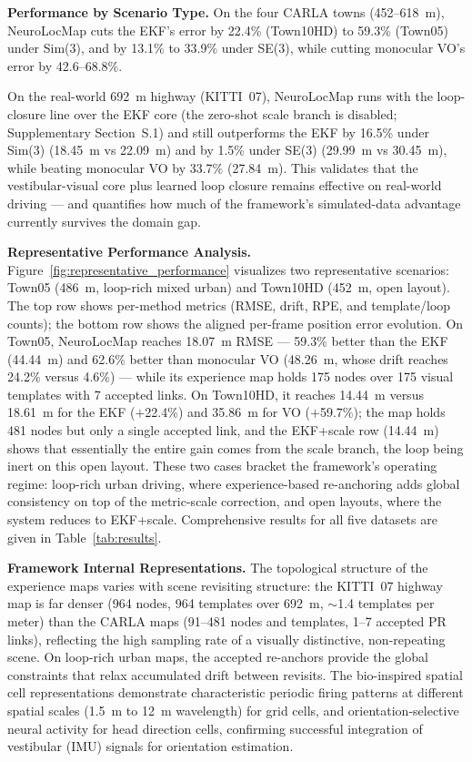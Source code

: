 \textbf{Performance by Scenario Type.} On the four CARLA towns (452--618~m), NeuroLocMap cuts the EKF's error by 22.4\% (Town10HD) to 59.3\% (Town05) under Sim(3), and by 13.1\% to 33.9\% under SE(3), while cutting monocular VO's error by 42.6--68.8\%.

On the real-world 692~m highway (KITTI~07), NeuroLocMap runs with the loop-closure line over the EKF core (the zero-shot scale branch is disabled; Supplementary Section~S.1) and still outperforms the EKF by 16.5\% under Sim(3) (18.45~m vs 22.09~m) and by 1.5\% under SE(3) (29.99~m vs 30.45~m), while beating monocular VO by 33.7\% (27.84~m). This validates that the vestibular-visual core plus learned loop closure remains effective on real-world driving --- and quantifies how much of the framework's simulated-data advantage currently survives the domain gap.

\textbf{Representative Performance Analysis.} Figure~\ref{fig:representative_performance} visualizes two representative scenarios: Town05 (486~m, loop-rich mixed urban) and Town10HD (452~m, open layout). The top row shows per-method metrics (RMSE, drift, RPE, and template/loop counts); the bottom row shows the aligned per-frame position error evolution. On Town05, NeuroLocMap reaches 18.07~m RMSE --- 59.3\% better than the EKF (44.44~m) and 62.6\% better than monocular VO (48.26~m, whose drift reaches 24.2\% versus 4.6\%) --- while its experience map holds 175 nodes over 175 visual templates with 7 accepted links. On Town10HD, it reaches 14.44~m versus 18.61~m for the EKF ($+$22.4\%) and 35.86~m for VO ($+$59.7\%); the map holds 481 nodes but only a single accepted link, and the EKF+scale row (14.44~m) shows that essentially the entire gain comes from the scale branch, the loop being inert on this open layout. These two cases bracket the framework's operating regime: loop-rich urban driving, where experience-based re-anchoring adds global consistency on top of the metric-scale correction, and open layouts, where the system reduces to EKF+scale. Comprehensive results for all five datasets are given in Table~\ref{tab:results}.

\textbf{Framework Internal Representations.} The topological structure of the experience maps varies with scene revisiting structure: the KITTI~07 highway map is far denser (964 nodes, 964 templates over 692~m, $\sim$1.4 templates per meter) than the CARLA maps (91--481 nodes and templates, 1--7 accepted PR links), reflecting the high sampling rate of a visually distinctive, non-repeating scene. On loop-rich urban maps, the accepted re-anchors provide the global constraints that relax accumulated drift between revisits. The bio-inspired spatial cell representations demonstrate characteristic periodic firing patterns at different spatial scales (1.5~m to 12~m wavelength) for grid cells, and orientation-selective neural activity for head direction cells, confirming successful integration of ves\-tib\-u\-lar (IMU) signals for orientation estimation.

